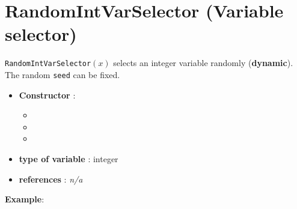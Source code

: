 \section{RandomIntVarSelector (Variable selector)}\label{randomvarint:randomvarintvarselector}\hypertarget{randomvarint:randomvarintvarselector}{}
\begin{notedef}
  \texttt{RandomIntVarSelector}$(x)$ selects an integer variable randomly (\textbf{dynamic}). The random \texttt{seed} can be fixed.
\end{notedef}

\begin{itemize}
	\item \textbf{Constructor} : 
	\begin{itemize}
	\item {}
	\item {}
	\item {}
	\end{itemize}	
	\item \textbf{type of variable} : integer
	\item \textbf{references} : \emph{n/a}
\end{itemize}

\textbf{Example}:
%

